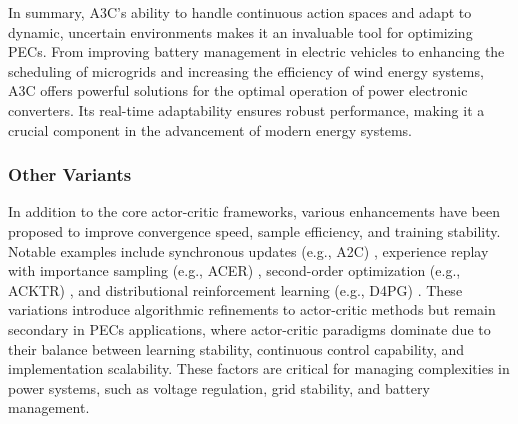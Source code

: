 

In summary, A3C's ability to handle continuous action spaces and adapt to dynamic, uncertain environments makes it an invaluable tool for optimizing PECs. From improving battery management in electric vehicles to enhancing the scheduling of microgrids and increasing the efficiency of wind energy systems, A3C offers powerful solutions for the optimal operation of power electronic converters. Its real-time adaptability ensures robust performance, making it a crucial component in the advancement of modern energy systems.

\subsubsection{Other Variants}

In addition to the core actor-critic frameworks, various enhancements have been proposed to improve convergence speed, sample efficiency, and training stability. Notable examples include synchronous updates (e.g., A2C) \cite{mnih2016asynchronous}, experience replay with importance sampling (e.g., ACER) \cite{wang2016sample}, second-order optimization (e.g., ACKTR) \cite{wu2017scalable}, and distributional reinforcement learning (e.g., D4PG) \cite{bellemare2017distributional}. These variations introduce algorithmic refinements to actor-critic methods but remain secondary in PECs applications, where actor-critic paradigms dominate due to their balance between learning stability, continuous control capability, and implementation scalability. These factors are critical for managing complexities in power systems, such as voltage regulation, grid stability, and battery management.

